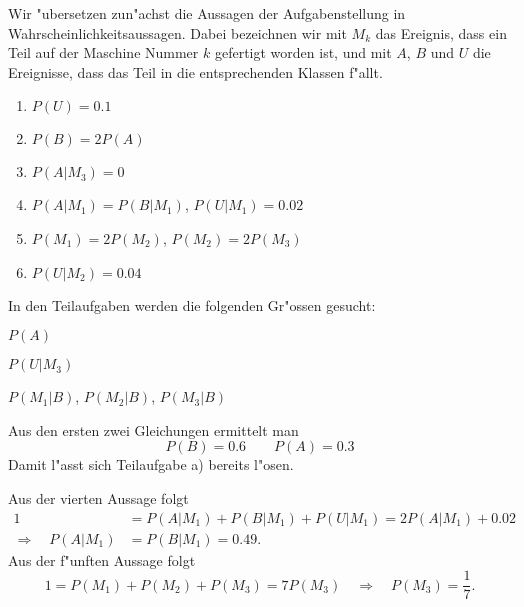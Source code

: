 \begin{loesung}
Wir "ubersetzen zun"achst die Aussagen der Aufgabenstellung
in Wahrscheinlichkeitsaussagen. Dabei bezeichnen wir mit $M_k$ das
Ereignis, dass ein Teil auf der Maschine Nummer $k$ gefertigt
worden ist, und mit $A$, $B$ und $U$ die Ereignisse, dass das Teil
in die entsprechenden Klassen f"allt.
\begin{enumerate}
\item $P(U)=0.1$                                %
\item $P(B)=2P(A)$                              %
\item $P(A|M_3)=0$
\item $P(A|M_1)=P(B|M_1)$, $P(U|M_1)=0.02$
\item $P(M_1)=2P(M_2)$, $P(M_2)=2P(M_3)$
\item $P(U|M_2)=0.04$                           %
\end{enumerate}
In den Teilaufgaben werden die folgenden Gr"ossen gesucht:
\begin{teilaufgaben}
\item $P(A)$
\item $P(U|M_3)$
\item $P(M_1|B)$, $P(M_2|B)$, $P(M_3|B)$
\end{teilaufgaben}

Aus den ersten zwei Gleichungen ermittelt man
\[
P(B)=0.6\qquad P(A)=0.3
\]
Damit l"asst sich Teilaufgabe a) bereits l"osen.

Aus der vierten Aussage folgt
\begin{align*}
1&=P(A|M_1)+P(B|M_1)+P(U|M_1)=2P(A|M_1)+0.02
\\
\Rightarrow\quad
P(A|M_1)&=P(B|M_1)=0.49.
\end{align*}
Aus der f"unften Aussage folgt
\[
1=P(M_1)+P(M_2)+P(M_3)=7P(M_3)
\quad\Rightarrow\quad
P(M_3)=\frac17.
\]


\end{loesung}
